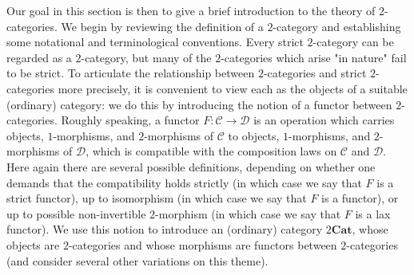 Our goal in this section is then to give a brief introduction to the theory of $2$-categories. We begin by reviewing the definition of a $2$-category and establishing some notational and terminological conventions. Every strict $2$-category can be regarded as a $2$-category, but many of the $2$-categories which arise "in nature" fail to be strict. To articulate the relationship between $2$-categories and strict $2$-categories more precisely, it is convenient to view each as the objects of a suitable (ordinary) category: we do this by introducing the notion of a functor between $2$-categories. Roughly speaking, a functor $F:\mathcal{C}\to\mathcal{D}$ is an operation which carries objects, $1$-morphisms, and $2$-morphisms of $\mathcal{C}$ to objects, $1$-morphisms, and $2$-morphisms of $\mathcal{D}$, which is compatible with the composition laws on $\mathcal{C}$ and $\mathcal{D}$. Here again there are several possible definitions, depending on whether one demands that the compatibility holds strictly (in which case we say that $F$ is a strict functor), up to isomorphism (in which case we say that $F$ is a functor), or up to possible non-invertible $2$-morphism (in which case we say that $F$ is a lax functor). We use this notion to introduce an (ordinary) category $2\mathbf{Cat}$, whose objects are $2$-categories and whose morphisms are functors between $2$-categories (and consider several other variations on this theme).
